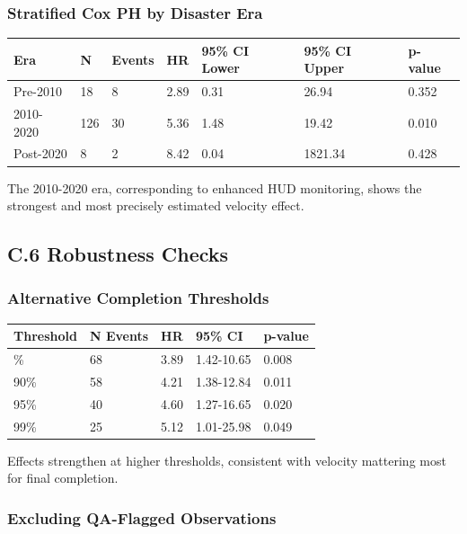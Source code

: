 \documentclass[
  12pt,
  letterpaper,
]{article}
\begin{document}
\subsubsection{Stratified Cox PH by Disaster
Era}\label{stratified-cox-ph-by-disaster-era}

\begin{longtable}[]{@{}lllllll@{}}
\toprule\noalign{}
Era & N & Events & HR & 95\% CI Lower & 95\% CI Upper & p-value \\
\midrule\noalign{}
\endhead
\bottomrule\noalign{}
\endlastfoot
Pre-2010 & 18 & 8 & 2.89 & 0.31 & 26.94 & 0.352 \\
2010-2020 & 126 & 30 & 5.36 & 1.48 & 19.42 & 0.010 \\
Post-2020 & 8 & 2 & 8.42 & 0.04 & 1821.34 & 0.428 \\
\end{longtable}

The 2010-2020 era, corresponding to enhanced HUD monitoring, shows the
strongest and most precisely estimated velocity effect.

\subsection{C.6 Robustness Checks}\label{c.6-robustness-checks}

\subsubsection{Alternative Completion
Thresholds}\label{alternative-completion-thresholds}

\begin{longtable}[]{@{}lllll@{}}
\toprule\noalign{}
Threshold & N Events & HR & 95\% CI & p-value \\
\midrule\noalign{}
\endhead
\bottomrule\noalign{}
\endlastfoot
85\% & 68 & 3.89 & 1.42-10.65 & 0.008 \\
90\% & 58 & 4.21 & 1.38-12.84 & 0.011 \\
95\% & 40 & 4.60 & 1.27-16.65 & 0.020 \\
99\% & 25 & 5.12 & 1.01-25.98 & 0.049 \\
\end{longtable}

Effects strengthen at higher thresholds, consistent with velocity
mattering most for final completion.

\subsubsection{Excluding QA-Flagged
Observations}\label{excluding-qa-flagged-observations}
\end{document}
